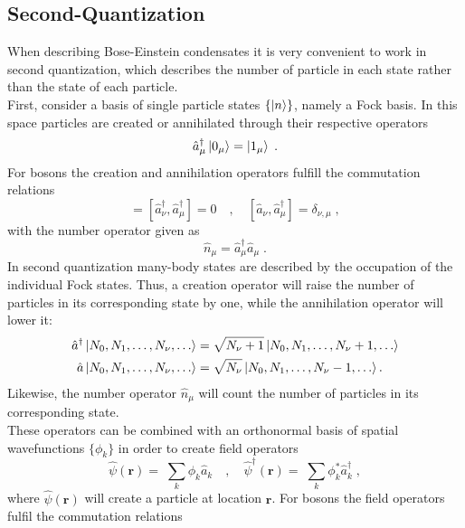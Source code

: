 \subsection{Second-Quantization}
When describing Bose-Einstein condensates it is very convenient to work in second quantization, which describes the number of particle in each state rather than the state of each particle.\\
First, consider a basis of single particle states $\{ \ket{n} \}$, namely a Fock basis. In this space particles are created or annihilated through their respective operators
\begin{equation}
	\hat{a}_{\mu}^{\dag} \ket{0_\mu} = \ket{1_\mu} \; .
\end{equation}
For bosons the creation and annihilation operators fulfill the commutation relations
\begin{equation}
[\hat{a}_\nu,\hat{a}_\mu]=[\hat{a}_\nu^\dagger,\hat{a}_\mu^\dagger]=0 \quad , \quad [\hat{a}_\nu,\hat{a}_\mu^\dagger]=\delta_{\nu,\mu} \; , 
\end{equation}
with the number operator given as
\begin{equation}
	\hat{n}_{\mu} = \hat{a}_{\mu}^{\dag} \hat{a}_{\mu} \; .
\end{equation}
In second quantization many-body states are described by the occupation of the individual Fock states. Thus, a creation operator will raise the number of particles in its corresponding state by one, while the annihilation operator will lower it:
\begin{align}
\hat{a}^\dagger \ket{N_0,N_1, \ldots , N_{\nu},\ldots}&= \sqrt{N_\nu+1}\ket{N_0,N_1, \ldots , N_{\nu}+1,\ldots} \\
\hat{a} \ket{N_0,N_1, \ldots , N_{\nu},\ldots}&= \sqrt{N_\nu}\ket{N_0,N_1, \ldots , N_{\nu}-1,\ldots} .
\end{align}
Likewise, the number operator $\hat{n}_{\mu}$ will count the number of particles in its corresponding state.\\
These operators can be combined with an orthonormal basis of spatial wavefunctions $\{ \phi_k \}$ in order to create field operators
\begin{equation}
	\hat{\psi}(\boldsymbol{r}) = \; \sum_{k} \phi_k \hat{a}_{k} \quad , \quad \hat{\psi}^{\dag}(\boldsymbol{r}) = \; \sum_{k} \phi_{k}^{*} \hat{a}_{k}^{\dag} \; ,
\end{equation}
where $\hat{\psi}(\boldsymbol{r})$ will create a particle at location $\boldsymbol{r}$. For bosons the field operators fulfil the commutation relations \cite{bruus}
